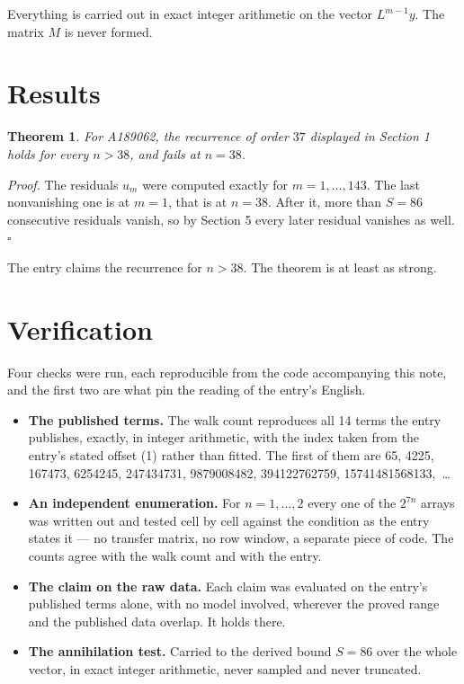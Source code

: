 \documentclass[11pt]{article}
\newtheorem{theorem}{Theorem}
\theoremstyle{definition}
\begin{document}
Everything is carried out in exact integer arithmetic on the vector $L^{m-1}y$. The matrix $M$ is never formed.

\section{Results}

\begin{theorem} For A189062, the recurrence of order $37$ displayed in Section 1 holds for every $n > 38$, and fails at $n = 38$.\end{theorem}

{\itshape Proof.} The residuals $u_m$ were computed exactly for $m = 1,\dots,143$. The last nonvanishing one is at $m = 1$, that is at $n = 38$. After it, more than $S = 86$ consecutive residuals vanish, so by Section 5 every later residual vanishes as well. $\square$

The entry claims the recurrence for $n > 38$. The theorem is at least as strong.

\section{Verification}

Four checks were run, each reproducible from the code accompanying this note, and the first two are what pin the reading of the entry's English.

\begin{itemize}

\item {\bfseries The published terms.} The walk count reproduces all 14 terms the entry publishes, exactly, in integer arithmetic, with the index taken from the entry's stated offset (1) rather than fitted. The first of them are 65, 4225, 167473, 6254245, 247434731, 9879008482, 394122762759, 15741481568133,~\dots

\item {\bfseries An independent enumeration.} For $n = 1,\dots,2$ every one of the $2^{7n}$ arrays was written out and tested cell by cell against the condition as the entry states it --- no transfer matrix, no row window, a separate piece of code. The counts agree with the walk count and with the entry.

\item {\bfseries The claim on the raw data.} Each claim was evaluated on the entry's published terms alone, with no model involved, wherever the proved range and the published data overlap. It holds there.

\item {\bfseries The annihilation test.} Carried to the derived bound $S = 86$ over the whole vector, in exact integer arithmetic, never sampled and never truncated.

\end{itemize}
\end{document}
